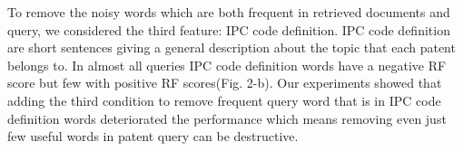 \documentclass{sig-alternate}
\begin{document}
To remove the noisy words which are both frequent in retrieved documents and query, we considered the third feature: IPC code definition. IPC code definition are short sentences giving a general description about the topic that each patent belongs to. In almost all queries IPC code definition words have a negative RF score but few with positive RF scores(Fig. 2-b). Our experiments showed that adding the third condition to remove frequent query word that is in IPC code definition words deteriorated the performance which means removing even just few useful words in patent query can be destructive.     
\end{document}
